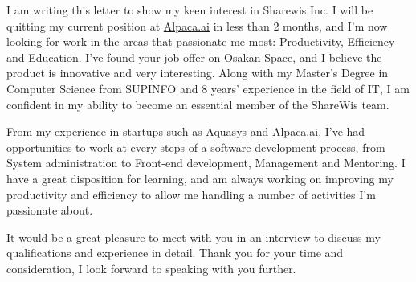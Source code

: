 \documentclass[10pt,stdletter,dateno,sigleft]{newlfm} %
\begin{document}
\begin{newlfm}


I am writing this letter to show my keen interest in Sharewis Inc. I will be
quitting my current position at \href{https://www.alpaca.ai/}{Alpaca.ai}
in less than 2 months, and I'm now looking for work in the areas that
passionate me most: Productivity, Efficiency and Education. I've found your job
offer on \href{http://www.osakan-space.com/blog/6690}{Osakan Space}, and I
believe the product is innovative and very interesting.  Along with my Master's
Degree in Computer Science from SUPINFO and 8 years' experience in the field of
IT, I am confident in my ability to become an essential member of the ShareWis
team.

From my experience in startups such as
\href{http://www.aquasys.co.jp/}{Aquasys} and
\href{https://www.alpaca.ai/}{Alpaca.ai}, I've had opportunities to work at
every steps of a software development process, from System administration to
Front-end development, Management and Mentoring. I have a great disposition for
learning, and am always working on improving my productivity and efficiency to
allow me handling a number of activities I'm passionate about. 

It would be a great pleasure to meet with you in an interview to discuss my
qualifications and experience in detail.  Thank you for your time and
consideration, I look forward to speaking with you further.


\end{newlfm}
\end{document}
